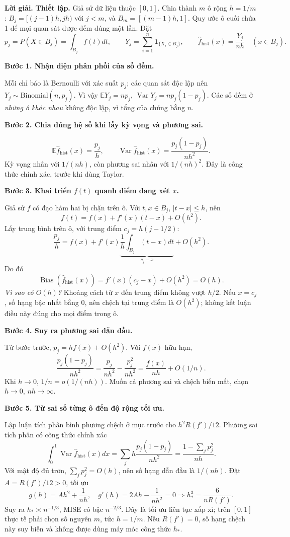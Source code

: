 \documentclass[11pt,a4paper]{article}
\newcommand{\E}{\mathbb E}
\DeclareMathOperator{\Var}{Var}
\DeclareMathOperator{\Bias}{Bias}
\newcommand{\buoc}[1]{\par\medskip\textbf{#1}\par}
\begin{document}
\textbf{Lời giải.}
\textbf{Thiết lập.} Giả sử dữ liệu thuộc $[0,1]$. Chia thành $m$ ô rộng $h=1/m$:
$B_j=[(j-1)h,jh)$ với $j<m$, và $B_m=[(m-1)h,1]$. Quy ước ô cuối chứa 1 để mọi quan sát được đếm đúng một lần. Đặt
\[
p_j=P(X\in B_j)=\int_{B_j}f(t)dt,\qquad
Y_j=\sum_{i=1}^n\mathbf1_{\{X_i\in B_j\}},\qquad
\widehat f_{\mathrm{hist}}(x)=\frac{Y_j}{nh}\quad(x\in B_j).
\]
\buoc{Bước 1. Nhận diện phân phối của số đếm.}
Mỗi chỉ báo là Bernoulli với xác suất $p_j$; các quan sát độc lập nên $Y_j\sim\mathrm{Binomial}(n,p_j)$. Vì vậy
$\E Y_j=np_j$, $\Var Y_j=np_j(1-p_j)$. Các số đếm ở \emph{những ô khác nhau} không độc lập, vì tổng của chúng bằng $n$.
\buoc{Bước 2. Chia đúng hệ số khi lấy kỳ vọng và phương sai.}
\[
\boxed{\E\widehat f_{\mathrm{hist}}(x)=\frac{p_j}{h},\qquad
\Var\widehat f_{\mathrm{hist}}(x)=\frac{p_j(1-p_j)}{nh^2}.}
\]
Kỳ vọng nhân với $1/(nh)$, còn phương sai nhân với $1/(nh)^2$. Đây là công thức chính xác, trước khi dùng Taylor.
\buoc{Bước 3. Khai triển $f(t)$ quanh điểm đang xét $x$.}
Giả sử $f$ có đạo hàm hai bị chặn trên ô. Với $t,x\in B_j$, $|t-x|\leq h$, nên
\[
f(t)=f(x)+f'(x)(t-x)+O(h^2).
\]
Lấy trung bình trên ô, với trung điểm $c_j=h(j-1/2)$:
\[
\frac{p_j}{h}=f(x)+f'(x)\underbrace{\frac1h\int_{B_j}(t-x)dt}_{c_j-x}+O(h^2).
\]
Do đó
\[
\boxed{\Bias(\widehat f_{\mathrm{hist}}(x))=f'(x)(c_j-x)+O(h^2)=O(h).}
\]
\textit{Vì sao có $O(h)$?} Khoảng cách từ $x$ đến trung điểm không vượt $h/2$. Nếu $x=c_j$, số hạng bậc nhất bằng 0, nên chệch tại trung điểm là $O(h^2)$; không kết luận điều này đúng cho mọi điểm trong ô.
\buoc{Bước 4. Suy ra phương sai dẫn đầu.}
Từ bước trước, $p_j=hf(x)+O(h^2)$. Với $f(x)$ hữu hạn,
\[
\frac{p_j(1-p_j)}{nh^2}
=\frac{p_j}{nh^2}-\frac{p_j^2}{nh^2}
=\boxed{\frac{f(x)}{nh}+O(1/n)}.
\]
Khi $h\to0$, $1/n=o(1/(nh))$. Muốn cả phương sai và chệch biến mất, chọn $h\to0$, $nh\to\infty$.

\buoc{Bước 5. Từ sai số từng ô đến độ rộng tối ưu.}
Lập luận tích phân bình phương chệch ở mục trước cho $h^2R(f')/12$. Phương sai tích phân có công thức chính xác
\[
\int_0^1\Var\widehat f_{\mathrm{hist}}(x)dx
=\sum_jh\frac{p_j(1-p_j)}{nh^2}
=\frac{1-\sum_jp_j^2}{nh}.
\]
Với mật độ đủ trơn, $\sum_jp_j^2=O(h)$, nên số hạng dẫn đầu là $1/(nh)$. Đặt $A=R(f')/12>0$, tối ưu
\[
g(h)=Ah^2+\frac1{nh},\quad g'(h)=2Ah-\frac1{nh^2}=0
\Longrightarrow h_*^3=\frac6{nR(f')}.
\]
Suy ra $h_*\asymp n^{-1/3}$, MISE có bậc $n^{-2/3}$. Đây là tối ưu liên tục xấp xỉ; trên $[0,1]$ thực tế phải chọn số nguyên $m$, tức $h=1/m$. Nếu $R(f')=0$, số hạng chệch này suy biến và không được dùng máy móc công thức $h_*$.
\end{document}
